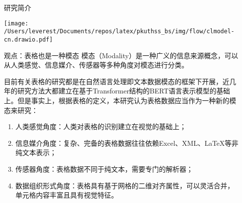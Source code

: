 \documentclass[final,hyperref={pdfpagelabels=false}]{ctexbeamer}
\begin{document}
\begin{frame}[t]
\begin{columns}[t]
\begin{column}{.3\textwidth}
\begin{block}{研究简介}
    \end{block}
    
    \vspace{8mm}
    \begin{center}
      \texttt{[image: /Users/leverest/Documents/repos/latex/pkuthss\_bs/img/flow/clmodel-cn.drawio.pdf]}
    \end{center}
    \vspace{8mm}

    \begin{block}{观点：表格也是一种模态}
      模态（Modality）是一种广义的信息来源概念，可以从人类感觉、信息媒介、传感器等多种角度对模态进行分类。

      \vspace{4mm}
      目前有关表格的研究都是在自然语言处理即文本数据模态的框架下开展，近几年的研究方法大都建立在基于Transformer结构的BERT语言表示模型的基础上。但是事实上，根据表格的定义，本研究认为表格数据应当作为一种新的模态来研究：
      
      \vspace{4mm}
      \begin{enumerate}
        \item 人类感觉角度：人类对表格的识别建立在视觉的基础上；
        \item 信息媒介角度：复杂、完备的表格数据往往依赖Excel、XML、LaTeX等非纯文本表示；
        \item 传感器角度：表格数据不同于纯文本，需要专门的解析器；
        \item 数据组织形式角度：表格具有基于网格的二维对齐属性，可以灵活合并，单元格内容丰富且具有视觉特征。
      \end{enumerate}
    \end{block}

  \end{column}


  \begin{column}{.02\textwidth}\end{column} %


\end{columns}
\end{frame}
\end{document}
